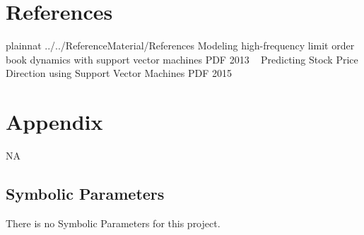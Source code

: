 \documentclass[12pt]{article}
\begin{document}
%
%
%

\newpage
\section{References}
 {plainnat}
 {../../ReferenceMaterial/References}
Modeling high-frequency limit order book dynamics with support vector machines PDF 2013
~\newline
Predicting Stock Price Direction using Support Vector Machines PDF 2015

\newpage

\section{Appendix}

NA

\subsection{Symbolic Parameters}

There is no Symbolic Parameters for this project.
\end{document}
